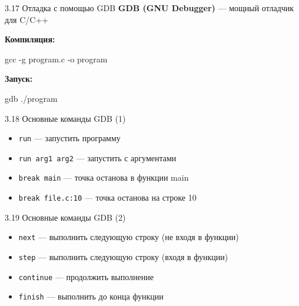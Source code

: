 \documentclass[
  ignorenonframetext,
  aspectratio=169,
  russian,
]{beamer}
\newenvironment{Shaded}{\begin{snugshade}}{\end{snugshade}}
\newcommand{\AttributeTok}[1]{\textcolor[rgb]{0.40,0.45,0.13}{#1}}
\newcommand{\FunctionTok}[1]{\textcolor[rgb]{0.28,0.35,0.67}{#1}}
\newcommand{\NormalTok}[1]{\textcolor[rgb]{0.00,0.23,0.31}{#1}}
\providecommand{\tightlist}{%
  \setlength{\itemsep}{0pt}\setlength{\parskip}{0pt}}
\begin{document}
\begin{frame}[fragile]{3.17 Отладка с помощью GDB}
\label{ux43eux442ux43bux430ux434ux43aux430-ux441-ux43fux43eux43cux43eux449ux44cux44e-gdb}
\textbf{GDB (GNU Debugger)} --- мощный отладчик для C/C++

\textbf{Компиляция:}

\begin{Shaded}
\begin{Highlighting}[]
\FunctionTok{gcc} \AttributeTok{{-}g}\NormalTok{ program.c }\AttributeTok{{-}o}\NormalTok{ program}
\end{Highlighting}
\end{Shaded}

\textbf{Запуск:}

\begin{Shaded}
\begin{Highlighting}[]
\FunctionTok{gdb}\NormalTok{ ./program}
\end{Highlighting}
\end{Shaded}
\end{frame}

\begin{frame}[fragile]{3.18 Основные команды GDB (1)}
\label{ux43eux441ux43dux43eux432ux43dux44bux435-ux43aux43eux43cux430ux43dux434ux44b-gdb-1}
\begin{itemize}[<+->]
\tightlist
\item
  \texttt{run} --- запустить программу
\item
  \texttt{run\ arg1\ arg2} --- запустить с аргументами
\item
  \texttt{break\ main} --- точка останова в функции main
\item
  \texttt{break\ file.c:10} --- точка останова на строке 10
\end{itemize}
\end{frame}

\begin{frame}[fragile]{3.19 Основные команды GDB (2)}
\label{ux43eux441ux43dux43eux432ux43dux44bux435-ux43aux43eux43cux430ux43dux434ux44b-gdb-2}
\begin{itemize}[<+->]
\tightlist
\item
  \texttt{next} --- выполнить следующую строку (не входя в функции)
\item
  \texttt{step} --- выполнить следующую строку (входя в функции)
\item
  \texttt{continue} --- продолжить выполнение
\item
  \texttt{finish} --- выполнить до конца функции
\end{itemize}
\end{frame}
\end{document}
